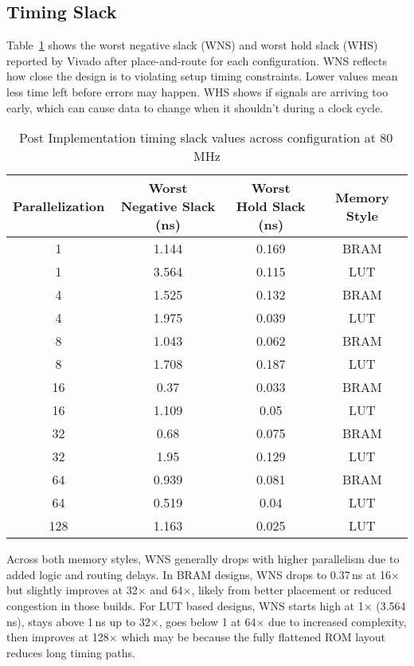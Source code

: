 \documentclass[a4paper,12pt]{report}
\begin{document}
\subsection{Timing Slack}
Table~\ref{table:timing_slack_comparison} shows the worst negative slack (WNS) and worst hold slack (WHS) reported by Vivado after place-and-route for each configuration. WNS reflects how close the design is to violating setup timing constraints. Lower values mean less time left before errors may happen. WHS shows if signals are arriving too early, which can cause data to change when it shouldn't during a clock cycle.
\begin{table}[H]
\centering
\renewcommand{\arraystretch}{1.2}
\begin{tabular}{|c|c|c|c|}
    \hline
    \textbf{Parallelization} & \makecell{\textbf{Worst } \\ \textbf{Negative Slack (ns)}} & \makecell{\textbf{Worst } \\ \textbf{Hold Slack (ns)}} & \textbf{Memory Style} \\
    \hline
    1   & 1.144 & 0.169 & BRAM \\
    \hline
    1   & 3.564 & 0.115 & LUT \\
    \hline
    4   & 1.525 & 0.132 & BRAM \\
    \hline
    4   & 1.975 & 0.039 & LUT \\
    \hline
    8   & 1.043 & 0.062 & BRAM \\
    \hline
    8   & 1.708 & 0.187 & LUT \\
    \hline
    16  & 0.37 & 0.033 & BRAM \\
    \hline
    16  & 1.109 & 0.05 & LUT \\
    \hline
    32  & 0.68 & 0.075 & BRAM \\
    \hline
    32  & 1.95 & 0.129 & LUT \\
    \hline
    64  & 0.939 & 0.081 & BRAM \\
    \hline
    64  & 0.519 & 0.04 & LUT \\
    \hline
    128 & 1.163 & 0.025 & LUT \\
    \hline
\end{tabular}
\vspace{1em}
\caption{Post Implementation timing slack values across configuration at 80\,MHz}
\label{table:timing_slack_comparison}
\end{table}
Across both memory styles, WNS generally drops with higher parallelism due to added logic and routing delays. In BRAM designs, WNS drops to 0.37\,ns at 16$\times$ but slightly improves at 32$\times$ and 64$\times$, likely from better placement or reduced congestion in those builds. For LUT based designs, WNS starts high at 1$\times$ (3.564\,ns), stays above 1\,ns up to 32$\times$, goes below 1 at 64$\times$ due to increased complexity, then improves at 128$\times$ which may be because the fully flattened ROM layout reduces long timing paths.
\end{document}
